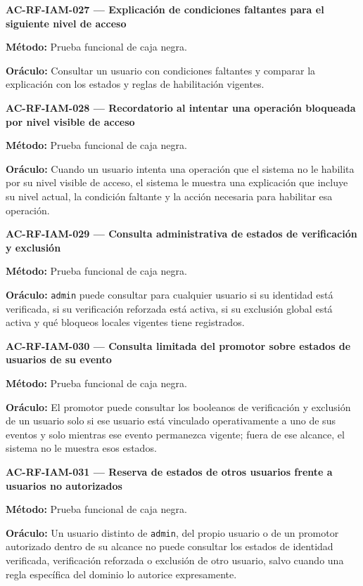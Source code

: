 \documentclass[10pt,letterpaper]{article}
\begin{document}
\noindent\textbf{AC-RF-IAM-027 --- Explicación de condiciones faltantes para el siguiente nivel de acceso}\par
\textbf{Método:} Prueba funcional de caja negra.\par
\textbf{Oráculo:} Consultar un usuario con condiciones faltantes y comparar la explicación con los estados y reglas de habilitación vigentes.\par\vspace{0.45em}
\noindent\textbf{AC-RF-IAM-028 --- Recordatorio al intentar una operación bloqueada por nivel visible de acceso}\par
\textbf{Método:} Prueba funcional de caja negra.\par
\textbf{Oráculo:} Cuando un usuario intenta una operación que el sistema no le habilita por su nivel visible de acceso, el sistema le muestra una explicación que incluye su nivel actual, la condición faltante y la acción necesaria para habilitar esa operación.\par\vspace{0.45em}
\noindent\textbf{AC-RF-IAM-029 --- Consulta administrativa de estados de verificación y exclusión}\par
\textbf{Método:} Prueba funcional de caja negra.\par
\textbf{Oráculo:} \texttt{admin} puede consultar para cualquier usuario si su identidad está verificada, si su verificación reforzada está activa, si su exclusión global está activa y qué bloqueos locales vigentes tiene registrados.\par\vspace{0.45em}
\noindent\textbf{AC-RF-IAM-030 --- Consulta limitada del promotor sobre estados de usuarios de su evento}\par
\textbf{Método:} Prueba funcional de caja negra.\par
\textbf{Oráculo:} El promotor puede consultar los booleanos de verificación y exclusión de un usuario solo si ese usuario está vinculado operativamente a uno de sus eventos y solo mientras ese evento permanezca vigente; fuera de ese alcance, el sistema no le muestra esos estados.\par\vspace{0.45em}
\noindent\textbf{AC-RF-IAM-031 --- Reserva de estados de otros usuarios frente a usuarios no autorizados}\par
\textbf{Método:} Prueba funcional de caja negra.\par
\textbf{Oráculo:} Un usuario distinto de \texttt{admin}, del propio usuario o de un promotor autorizado dentro de su alcance no puede consultar los estados de identidad verificada, verificación reforzada o exclusión de otro usuario, salvo cuando una regla específica del dominio lo autorice expresamente.\par\vspace{0.45em}
\end{document}
